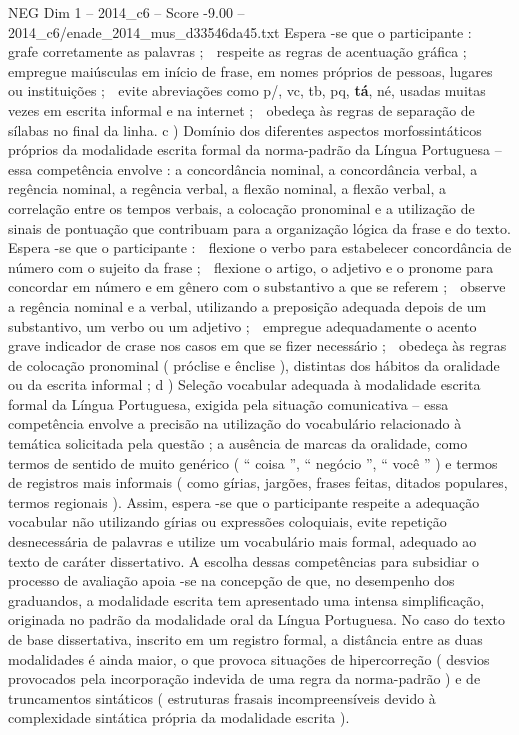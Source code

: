 \begin{textsample}{NEG Dim 1 – 2014\_c6 – Score -9.00 – 2014\_c6/enade\_2014\_mus\_d33546da45.txt}
Espera -se que o participante :  grafe corretamente as palavras ;  respeite as regras de acentuação gráfica ;  empregue maiúsculas em início de frase, em nomes próprios de pessoas, lugares ou instituições ;  evite abreviações como p/, vc, tb, pq, \textbf{tá}, né, usadas muitas vezes em escrita informal e na internet ;  obedeça às regras de separação de sílabas no final da linha. c ) Domínio dos diferentes aspectos morfossintáticos próprios da modalidade escrita formal da norma-padrão da Língua Portuguesa – essa competência envolve : a concordância nominal, a concordância verbal, a regência nominal, a regência verbal, a flexão nominal, a flexão verbal, a correlação entre os tempos verbais, a colocação pronominal e a utilização de sinais de pontuação que contribuam para a organização lógica da frase e do texto.
Espera -se que o participante :  flexione o verbo para estabelecer concordância de número com o sujeito da frase ;  flexione o artigo, o adjetivo e o pronome para concordar em número e em gênero com o substantivo a que se referem ;  observe a regência nominal e a verbal, utilizando a preposição adequada depois de um substantivo, um verbo ou um adjetivo ;  empregue adequadamente o acento grave indicador de crase nos casos em que se fizer necessário ;  obedeça às regras de colocação pronominal ( próclise e ênclise ), distintas dos hábitos da oralidade ou da escrita informal ; d ) Seleção vocabular adequada à modalidade escrita formal da Língua Portuguesa, exigida pela situação comunicativa – essa competência envolve a precisão na utilização do vocabulário relacionado à temática solicitada pela questão ; a ausência de marcas da oralidade, como termos de sentido de muito genérico ( “ coisa ”, “ negócio ”, “ você ” ) e termos de registros mais informais ( como gírias, jargões, frases feitas, ditados populares, termos regionais ).
Assim, espera -se que o participante respeite a adequação vocabular não utilizando gírias ou expressões coloquiais, evite repetição desnecessária de palavras e utilize um vocabulário mais formal, adequado ao texto de caráter dissertativo.
A escolha dessas competências para subsidiar o processo de avaliação apoia -se na concepção de que, no desempenho dos graduandos, a modalidade escrita tem apresentado uma intensa simplificação, originada no padrão da modalidade oral da Língua Portuguesa.
No caso do texto de base dissertativa, inscrito em um registro formal, a distância entre as duas modalidades é ainda maior, o que provoca situações de hipercorreção ( desvios provocados pela incorporação indevida de uma regra da norma-padrão ) e de truncamentos sintáticos ( estruturas frasais incompreensíveis devido à complexidade sintática própria da modalidade escrita ).

\end{textsample}
